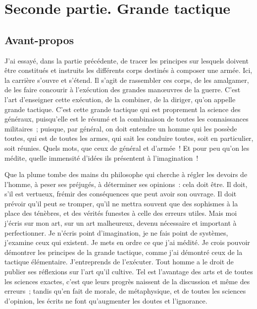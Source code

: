 \documentclass[french,twoside]{book} %
\begin{document}
\section[{Seconde partie. Grande tactique}]{Seconde partie. Grande tactique}\renewcommand{\leftmark}{Seconde partie. Grande tactique}

\subsection[{Avant-propos}]{Avant-propos}
\noindent J’ai essayé, dans la partie précédente, de tracer les principes sur lesquels doivent être constitués et instruits les différents corps destinés à composer une armée. Ici, la carrière s’ouvre et s’étend. Il s’agit de rassembler ces corps, de les amalgamer, de les faire concourir à l’exécution des grandes manœuvres de la guerre. C’est l’art d’enseigner cette exécution, de la combiner, de la diriger, qu’on appelle grande tactique. C’est cette grande tactique qui est proprement la science des généraux, puisqu’elle est le résumé et la combinaison de toutes les connaissances militaires ; puisque, par général, on doit entendre un homme qui les possède toutes, qui est de toutes les armes, qui sait les conduire toutes, soit en particulier, soit réunies. Quels mots, que ceux de général et d’armée ! Et pour peu qu’on les médite, quelle immensité d’idées ils présentent à l’imagination !\par
Que la plume tombe des mains du philosophe qui cherche à régler les devoirs de l’homme, à peser ses préjugés, à déterminer ses opinions : cela doit être. Il doit, s’il est vertueux, frémir des conséquences que peut avoir son ouvrage. Il doit prévoir qu’il peut se tromper, qu’il ne mettra souvent que des sophismes à la place des ténèbres, et des vérités funestes à celle des erreurs utiles. Mais moi j’écris sur mon art, sur un art malheureux, devenu nécessaire et important à perfectionner. Je n’écris point d’imagination, je ne fais point de systèmes, j’examine ceux qui existent. Je mets en ordre ce que j’ai médité. Je crois pouvoir démontrer les principes de la grande tactique, comme j’ai démontré ceux de la tactique élémentaire. J’entreprends de l’exécuter. Tout homme a le droit de publier ses réflexions sur l’art qu’il cultive. Tel est l’avantage des arts et de toutes les sciences exactes, c’est que leurs progrès naissent de la discussion et même des erreurs ; tandis qu’en fait de morale, de métaphysique, et de toutes les sciences d’opinion, les écrits ne font qu’augmenter les doutes et l’ignorance.\par
\end{document}
